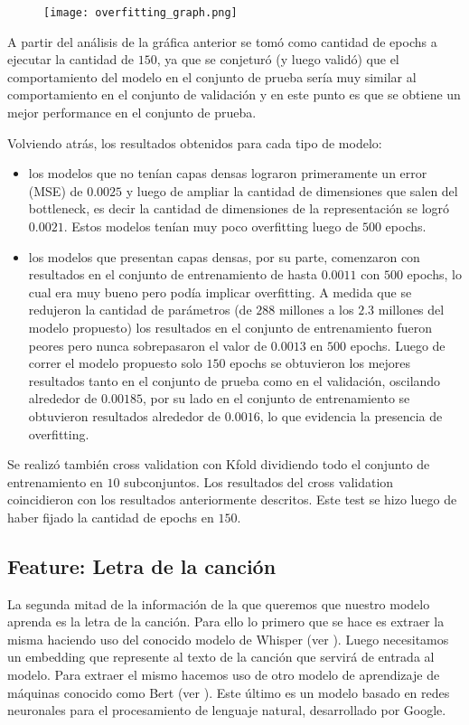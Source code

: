 \documentclass[colorinlistoftodos,twoside,twocolumn,10pt]{article} %
\begin{document}
\begin{figure}[h!]
	\texttt{[image: overfitting\_graph.png]}
\end{figure}

A partir del análisis de la gráfica anterior se tomó como cantidad de epochs a ejecutar la cantidad de $150$, ya que se conjeturó (y luego validó) que el comportamiento del modelo en el conjunto de prueba sería muy similar al comportamiento en el conjunto de validación y en este punto es que se obtiene un mejor performance en el conjunto de prueba. 

Volviendo atrás, los resultados obtenidos para cada tipo de modelo:
\begin{itemize}
	\item los modelos que no tenían capas densas lograron primeramente un error (MSE) de $0.0025$ y luego de ampliar la   cantidad de dimensiones que salen del bottleneck, es decir la cantidad de dimensiones de la representación se logró $0.0021$. Estos modelos tenían muy poco overfitting luego de $500$ epochs.
	\item los modelos que presentan capas densas, por su parte, comenzaron con resultados en el conjunto de entrenamiento de hasta $0.0011$ con $500$ epochs, lo cual era muy bueno pero podía implicar overfitting. A medida que se redujeron la cantidad de parámetros (de $288$ millones a los $2.3$ millones del modelo propuesto) los resultados en el conjunto de entrenamiento fueron peores pero nunca sobrepasaron el valor de $0.0013$ en $500$ epochs. Luego de correr el modelo propuesto solo $150$ epochs se obtuvieron los mejores resultados tanto en el conjunto de prueba como en el validación, oscilando alrededor de $0.00185$, por su lado en el conjunto de entrenamiento se obtuvieron resultados alrededor de $0.0016$, lo que evidencia la presencia de overfitting.
\end{itemize}

Se realizó también cross validation con Kfold dividiendo todo el conjunto de entrenamiento en $10$ subconjuntos. Los resultados del cross validation coincidieron con los resultados anteriormente descritos. Este test se hizo luego de haber fijado la cantidad de epochs en $150$.

\subsection{Feature: Letra de la canci\'on}

La segunda mitad de la informaci\'on de la que queremos que nuestro modelo aprenda es la letra de la canci\'on. Para ello lo primero que se hace es extraer la misma haciendo uso del conocido modelo de Whisper (ver \cite{whisper}). Luego necesitamos un embedding que represente al texto de la canci\'on que servir\'a de entrada al modelo. Para extraer el mismo hacemos uso de otro modelo de aprendizaje de m\'aquinas conocido como Bert (ver \cite{bert}). Este \'ultimo es un modelo basado en redes neuronales para el procesamiento de lenguaje natural, desarrollado por Google.
\end{document}

